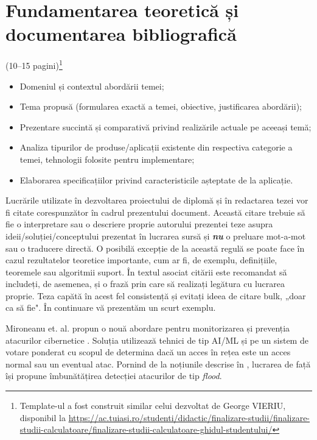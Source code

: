 \iffalse

\chapter{Fundamentarea teoretică și documentarea bibliografică}
\label{cap:cap1}

(10–15 pagini)\footnote{Template-ul a fost construit similar celui dezvoltat de George VIERIU, disponibil la \url{https://ac.tuiasi.ro/studenti/didactic/finalizare-studii/finalizare-studii-calculatoare/finalizare-studii-calculatoare-ghidul-studentului/}}

\begin{itemize}
    \item Domeniul și contextul abordării temei;
    \item Tema propusă (formularea exactă a temei, obiective, justificarea abordării);
    \item Prezentare succintă și comparativă privind realizările actuale pe aceeași temă;
    \item Analiza tipurilor de produse/aplicații existente din respectiva categorie a temei,
tehnologii folosite pentru implementare;
    \item Elaborarea specificațiilor privind caracteristicile așteptate de la aplicație. 
\end{itemize}

Lucrările utilizate în dezvoltarea proiectului de diplomă și în redactarea tezei vor fi citate corespunzător în cadrul prezentului document. Această citare trebuie să fie o interpretare sau o descriere proprie autorului prezentei teze asupra ideii/soluției/conceptului prezentat în lucrarea sursă și \textbf{\textit{nu}} o preluare mot-a-mot sau o traducere directă. O posibilă excepție de la această regulă se poate face în cazul rezultatelor teoretice importante, cum ar fi, de exemplu, definițiile, teoremele sau algoritmii suport. În textul asociat citării este recomandat să includeți, de asemenea, și o frază prin care să realizați legătura cu lucrarea proprie. Teza capătă în acest fel consistență și evitați ideea de citare bulk, „doar ca să fie". În continuare vă prezentăm un scurt exemplu.


Mironeanu et. al. propun o nouă abordare pentru monitorizarea și prevenția atacurilor cibernetice \cite{art:mironeanu:ECAD:2021}. Soluția utilizează tehnici de tip AI/ML și pe un sistem de votare ponderat cu scopul de determina dacă un acces în rețea este un acces normal sau un eventual atac. Pornind de la noțiunile descrise în \cite{art:mironeanu:ECAD:2021}, lucrarea de față își propune îmbunătățirea detecției atacurilor de tip \textit{flood}.

